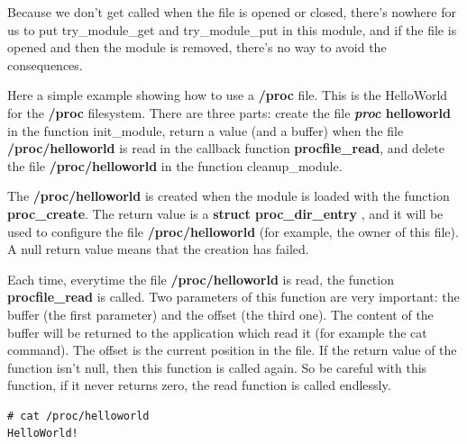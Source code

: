 \documentclass[11pt]{article}
\begin{document}
Because we don't get called when the file is opened or closed, there's nowhere for us to put try\_module\_get and try\_module\_put in this module, and if the file is opened and then the module is removed, there's no way to avoid the consequences.

Here a simple example showing how to use a \textbf{/proc} file. This is the HelloWorld for the \textbf{/proc} filesystem. There are three parts: create the file \textbf{\emph{proc} helloworld} in the function init\_module, return a value (and a buffer) when the file \textbf{/proc/helloworld} is read in the callback function \textbf{procfile\_read}, and delete the file \textbf{/proc/helloworld} in the function cleanup\_module.

The \textbf{/proc/helloworld} is created when the module is loaded with the function \textbf{proc\_create}. The return value is a \textbf{struct proc\_dir\_entry} , and it will be used to configure the file \textbf{/proc/helloworld} (for example, the owner of this file). A null return value means that the creation has failed.

Each time, everytime the file \textbf{/proc/helloworld} is read, the function \textbf{procfile\_read} is called. Two parameters of this function are very important: the buffer (the first parameter) and the offset (the third one). The content of the buffer will be returned to the application which read it (for example the cat command). The offset is the current position in the file. If the return value of the function isn't null, then this function is called again. So be careful with this function, if it never returns zero, the read function is called endlessly.

\begin{verbatim}
# cat /proc/helloworld
HelloWorld!
\end{verbatim}
\end{document}
